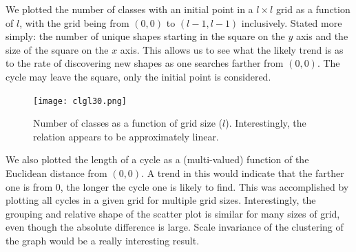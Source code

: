 \documentclass{article}
\begin{document}
We plotted the number of classes with an initial point in a $l \times l$ grid as a function of $l$, with the grid being from $(0,0)$ to $(l-1,l-1)$ inclusively. Stated more simply: the number of unique shapes starting in the square on the $y$ axis and the size of the square on the $x$ axis. This allows us to see what the likely trend is as to the rate of discovering new shapes as one searches farther from $(0,0)$. The cycle may leave the square, only the initial point is considered.

\begin{figure}[H]
\center
\texttt{[image: clgl30.png]}
\caption{Number of classes as a function of grid size ($l$). Interestingly, the relation appears to be approximately linear.}
\end{figure}

We also plotted the length of a cycle as a (multi-valued) function of the Euclidean distance from $(0,0)$. A trend in this would indicate that the farther one is from $0$, the longer the cycle one is likely to find. This was accomplished by plotting all cycles in a given grid for multiple grid sizes. Interestingly, the grouping and relative shape of the scatter plot is similar for many sizes of grid, even though the absolute difference is large. Scale invariance of the clustering of the graph would be a really interesting result.
\end{document}
